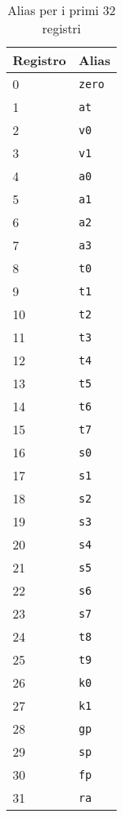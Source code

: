 \documentclass[12pt]{report}
\begin{document}
\begin{table}[!htb]
	\begin{centering}
		\begin{tabular}{ll}
			\hline
			\hline
			Registro & Alias\\
			\hline
			0 & \texttt{zero}\\
			1 & \texttt{at}\\
			2 & \texttt{v0}\\
			3 & \texttt{v1}\\
			4 & \texttt{a0}\\
			5 & \texttt{a1}\\
			6 & \texttt{a2}\\
			7 & \texttt{a3}\\
			8 & \texttt{t0}\\
			9 & \texttt{t1}\\
			10 & \texttt{t2}\\
			11 & \texttt{t3}\\
			12 & \texttt{t4}\\
			13 & \texttt{t5}\\
			14 & \texttt{t6}\\
			15 & \texttt{t7}\\
			16 & \texttt{s0}\\
			17 & \texttt{s1}\\
			18 & \texttt{s2}\\
			19 & \texttt{s3}\\
			20 & \texttt{s4}\\
			21 & \texttt{s5}\\
			22 & \texttt{s6}\\
			23 & \texttt{s7}\\
			24 & \texttt{t8}\\
			25 & \texttt{t9}\\
			26 & \texttt{k0}\\
			27 & \texttt{k1}\\
			28 & \texttt{gp}\\
			29 & \texttt{sp}\\
			30 & \texttt{fp}\\
			31 & \texttt{ra}\\
		\end{tabular}
		\caption{Alias per i primi 32 registri}
		\label{table:mips32-reg}
	\end{centering}
\end{table}

\end{document}
